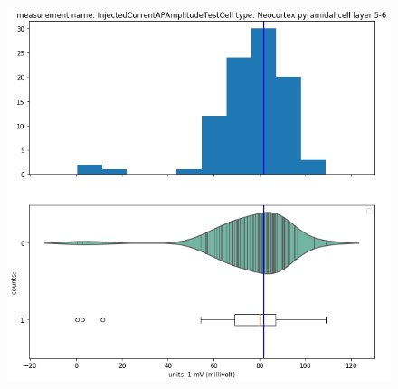 \begin{figure}
\begin{center}
\includegraphics[width=0.7\linewidth]{chapters/notebooks_converted/needata_thesis_files/needata_thesis_5_16}
\end{center}
\end{figure}
